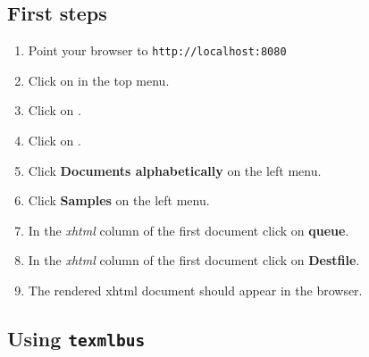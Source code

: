 \documentclass[a4paper]{article}
\newcommand{\texmlbus}{\texttt{texmlbus}}
\begin{document}
\subsection{First steps}
\begin{enumerate}
\item Point your browser to \texttt{http://localhost:8080}
\item Click on  in the top menu.
\item Click on .
\item Click on .
\item Click \textbf{Documents alphabetically} on the left menu. 
\item Click \textbf{Samples} on the left menu. 
\item In the \textit{xhtml} column of the first document click on \textbf{queue}.
\item In the \textit{xhtml} column of the first document click on \textbf{Destfile}.
\item The rendered xhtml document should appear in the browser.
\end{enumerate}

\subsection{Using \texmlbus}
\end{document}
